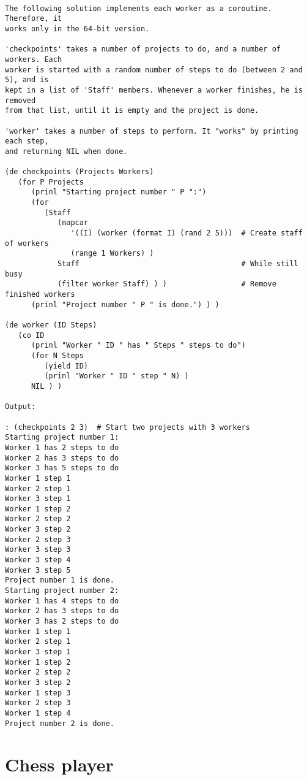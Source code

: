 \begin{verbatim}

The following solution implements each worker as a coroutine. Therefore, it
works only in the 64-bit version.

'checkpoints' takes a number of projects to do, and a number of workers. Each
worker is started with a random number of steps to do (between 2 and 5), and is
kept in a list of 'Staff' members. Whenever a worker finishes, he is removed
from that list, until it is empty and the project is done.

'worker' takes a number of steps to perform. It "works" by printing each step,
and returning NIL when done.

(de checkpoints (Projects Workers)
   (for P Projects
      (prinl "Starting project number " P ":")
      (for
         (Staff
            (mapcar
               '((I) (worker (format I) (rand 2 5)))  # Create staff of workers
               (range 1 Workers) )
            Staff                                     # While still busy
            (filter worker Staff) ) )                 # Remove finished workers
      (prinl "Project number " P " is done.") ) )

(de worker (ID Steps)
   (co ID
      (prinl "Worker " ID " has " Steps " steps to do")
      (for N Steps
         (yield ID)
         (prinl "Worker " ID " step " N) )
      NIL ) )

Output:

: (checkpoints 2 3)  # Start two projects with 3 workers
Starting project number 1:
Worker 1 has 2 steps to do
Worker 2 has 3 steps to do
Worker 3 has 5 steps to do
Worker 1 step 1
Worker 2 step 1
Worker 3 step 1
Worker 1 step 2
Worker 2 step 2
Worker 3 step 2
Worker 2 step 3
Worker 3 step 3
Worker 3 step 4
Worker 3 step 5
Project number 1 is done.
Starting project number 2:
Worker 1 has 4 steps to do
Worker 2 has 3 steps to do
Worker 3 has 2 steps to do
Worker 1 step 1
Worker 2 step 1
Worker 3 step 1
Worker 1 step 2
Worker 2 step 2
Worker 3 step 2
Worker 1 step 3
Worker 2 step 3
Worker 1 step 4
Project number 2 is done.

\end{verbatim}

\section*{Chess player}

